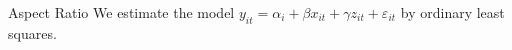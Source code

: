 \documentclass[aspectratio=169]{beamer}
\begin{document}
\begin{frame}{Aspect Ratio}
  We estimate the model $y_{it} = \alpha_i + \beta x_{it} + \gamma z_{it} + \varepsilon_{it}$ by ordinary least squares.
\end{frame}
\end{document}
